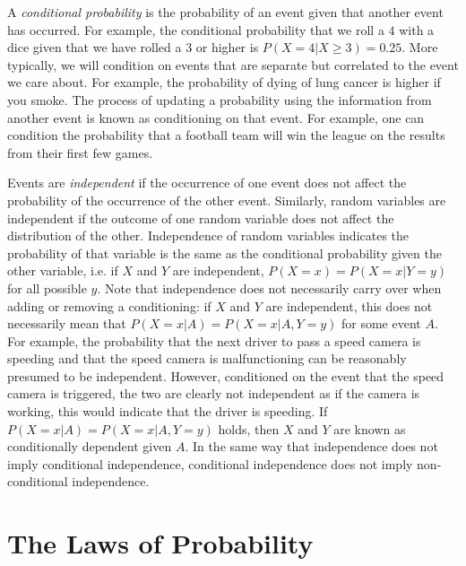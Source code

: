A \emph{conditional probability} is the probability of an event given that another event has occurred.
For example, the conditional probability that we roll a $4$ with a dice given that we have rolled a $3$ or
higher is $P(X=4 | X\ge3) = 0.25$.  More typically, we will condition on events that are separate but
correlated to the event we care about.  For example, the probability of dying of lung cancer is higher
if you smoke.  The process of updating a probability using the information from another event is
known as conditioning on that event.  For example, one can condition the probability that a football team will win the league on the results from their first few games.

Events are \emph{independent} if the occurrence of one event does not affect the probability of 
the occurrence of the other event.  Similarly, random variables are independent if the outcome of
one random variable does not affect the distribution of the other.  Independence of random variables
indicates the probability of that variable is the same as the conditional probability given the other
variable, i.e. if $X$ and $Y$ are independent, $P(X=x)=P(X=x|Y=y)$ for all possible $y$.  Note that 
independence does not necessarily carry over when adding or removing a conditioning:
if $X$ and $Y$ are independent, this does not necessarily mean that $P(X=x|A) = P(X=x|A,Y=y)$
for some event $A$.  For example, the probability that the next driver to pass a speed camera
is speeding and that the speed camera is
malfunctioning can be reasonably presumed to be independent.  However, conditioned on the
event that the speed camera is triggered, the two are clearly not independent as if the camera is working,
this would indicate that the driver is speeding.
If $P(X=x|A) = P(X=x|A,Y=y)$ holds, then $X$ and
$Y$ are known as conditionally dependent given $A$.  In the same way that independence does not
imply conditional independence, conditional independence does not imply non-conditional independence.

\section{The Laws of Probability}
\label{sec:prob:laws}

